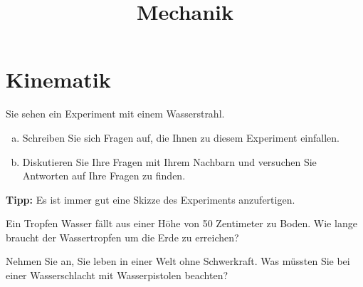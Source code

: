 \documentclass[12pt,a4paper,twoside]{article}
\title{Mechanik}
\date{}
\def\dir{./Aufgaben_Mechanik/}
\newcommand{\Einbinden}[1]{}
\begin{document}
\maketitle



\newpage

\section{Kinematik}



\Einbinden{\dir/geschwindigkeit00a.tex}
\Einbinden{\dir/geschwindigkeit00b.tex}

\Einbinden{\dir/geschwindigkeit01.tex}
\Einbinden{\dir/geschwindigkeit02.tex}
\Einbinden{\dir/geschwindigkeit03.tex}
\Einbinden{\dir/geschwindigkeit04.tex}
\newpage
\Einbinden{\dir/geschwindigkeit05.tex}

\newpage
\Einbinden{\dir/geschwindigkeit06.tex}
\Einbinden{\dir/geschwindigkeit07.tex}

\newpage

\Einbinden{\dir/beschleunigung01.tex}
\Einbinden{\dir/beschleunigung02.tex}
\Einbinden{\dir/kinematik01.tex}

\newpage
\newpage
\begin{aufgabe}
	\label{ExpWasserstrahl}
	Sie sehen ein Experiment mit einem Wasserstrahl.
	\begin{enumerate} [a)]
		\item	Schreiben Sie sich Fragen auf, die Ihnen zu diesem Experiment einfallen.
		\item	Diskutieren Sie Ihre Fragen mit Ihrem Nachbarn und versuchen Sie Antworten auf Ihre Fragen zu finden.
	\end{enumerate}

	\textbf{Tipp:} Es ist immer gut eine Skizze des Experiments anzufertigen.

\end{aufgabe}

\begin{aufgabe}
Ein Tropfen Wasser fällt aus einer Höhe von 50 Zentimeter zu Boden.
Wie lange braucht der Wassertropfen um die Erde zu erreichen?
\end{aufgabe}

\begin{aufgabe}
Nehmen Sie an, Sie leben in einer Welt ohne Schwerkraft.
Was müssten Sie bei einer Wasserschlacht mit Wasserpistolen beachten?
\end{aufgabe}
\end{document}
